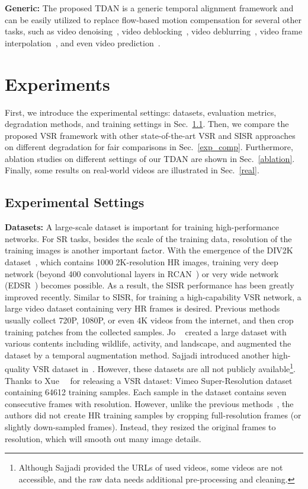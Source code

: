 \documentclass[10pt,twocolumn,letterpaper]{article}
\begin{document}
\noindent \textbf{Generic:} The proposed TDAN is a generic temporal alignment framework and can be easily utilized to replace flow-based motion compensation for several other tasks, such as video denoising~\cite{mahmoudi2005fast}, video deblocking~\cite{maggioni2012video}, video deblurring~\cite{hyun2015generalized}, video frame interpolation~\cite{ascenso2005improving}, and even video prediction~\cite{wichers2018hierarchical}.


\section{Experiments}
\label{exp}
First, we introduce the experimental settings: datasets, evaluation metrics, degradation methods, and training settings in Sec.~\ref{exp_setting}. Then, we compare the proposed VSR framework with other state-of-the-art VSR and SISR approaches on different degradation for fair comparisons in Sec.~\ref{exp_comp}. Furthermore, ablation studies on different settings of our TDAN are shown in Sec.~\ref{ablation}. Finally, some results on real-world videos are illustrated in Sec.~\ref{real}.

\subsection{Experimental Settings}
\label{exp_setting}
\noindent \textbf{Datasets:}
A large-scale dataset is important for training high-performance networks. For SR tasks, besides the scale of the training data, resolution of the training images is another important factor. With the emergence of the DIV2K dataset~\cite{timofte2017ntire}, which contains 1000 2K-resolution HR images, training very deep network (\eg beyond 400 convolutional layers in RCAN~\cite{zhang2018image}) or very wide network (\eg EDSR~\cite{lim2017enhanced}) becomes possible. As a result, the SISR performance has been greatly improved recently. Similar to SISR, for training a high-capability VSR network, a large video dataset containing very HR frames is desired. Previous methods~\cite{liu2017robust,tao2017detail,caballero2017real,sajjadi2018frame,jo2018deep} usually collect 720P, 1080P, or even 4K videos from the internet, and then crop training patches from the collected samples. Jo \etal~\cite{jo2018deep} created a large dataset with various contents including wildlife, activity, and landscape, and augmented the dataset by a temporal augmentation method. Sajjadi \etal introduced another high-quality VSR dataset in~\cite{sajjadi2018frame}. However, these datasets are all not publicly available\footnote{Although Sajjadi \etal provided the URLs of used videos, some videos are not accessible, and the raw data needs additional pre-processing and cleaning.}. Thanks to Xue~\etal~\cite{xue2017video} for releasing a VSR dataset: Vimeo Super-Resolution dataset containing 64612 training samples. Each sample in the dataset contains seven consecutive frames with  resolution. However, unlike the previous methods~\cite{sajjadi2018frame,jo2018deep}, the authors did not create HR training samples by cropping full-resolution frames (or slightly down-sampled frames). Instead, they resized the original frames to  resolution, which will smooth out many image details.
\end{document}

